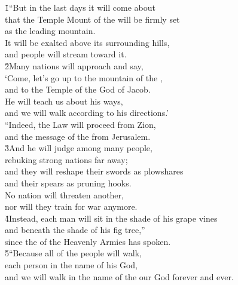 \begin{poetry}
\poeml {}
\v{1}``But in the last days it will come about \\
\poemll    that the Temple Mount of the  will be firmly set \\
\poemlll       as the leading mountain. \\
\poeml It will be exalted above its surrounding hills, \\
\poemll    and people will stream toward it. \\
\poeml \v{2}Many nations will approach and say, \\
\poemll    `Come, let's go up to the mountain of the , \\
\poemlll       and to the Temple of the God of Jacob. \\
\poemll    He will teach us about his ways, \\
\poemlll       and we will walk according to his directions.' \\
\poeml ``Indeed, the Law will proceed from Zion, \\
\poemll    and the message of the  from Jerusalem. \\
\poeml \v{3}And he will judge among many people, \\
\poemll    rebuking strong nations far away; \\
\poeml and they will reshape their swords as plowshares \\
\poemll    and their spears as pruning hooks. \\
\poeml No nation will threaten another, \\
\poemll    nor will they train for war anymore. \\
\poeml \v{4}Instead, each man will sit in the shade of his grape vines \\
\poemll    and beneath the shade of his fig tree,'' \\
\poemlll       since the  of the Heavenly Armies has spoken. \\
\poeml \v{5}``Because all of the people will walk, \\
\poemll    each person in the name of his God, \\
\poemlll       and we will walk in the name of the  our God forever and ever. \\

\end{poetry}

